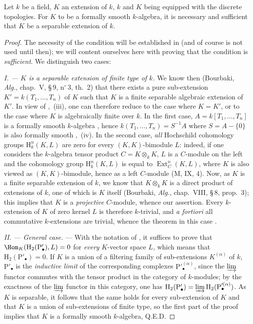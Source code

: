\begin{theorem}[19.6.1) (Cohen]
\label{0.19.6.1}
Let $k$ be a field, $K$ an extension of $k$, $k$ and $K$ being equipped with the discrete topologies.
For $K$ to be a formally smooth $k$-algebra, it is necessary and sufficient that $K$ be a separable extension of $k$.
\end{theorem}

\begin{proof}
The necessity of the condition will be established in  (and of course is not used until then);
we will content ourselves here with proving that the condition is \emph{sufficient}.
We distinguish two cases:

\emph{I. --- $K$ is a separable extension of finite type of $k$.}
We know then (Bourbaki, \emph{Alg.}, chap.~V, \S\,9, n$^\circ$\,3, th.~2) that there exists a pure sub-extension $K'=k(T_1,\ldots,T_n)$ of $K$ such that $K$ is a finite separable algebraic extension of $K'$.
  In view of ,~(iii), one can therefore reduce to the case where $K=K'$, or to the case where $K$ is algebraically finite over $k$.
In the first case, $A=k[T_1,\ldots,T_n]$ is a formally smooth $k$-algebra , hence $k(T_1,\ldots,T_n)=S^{-1}A$ where $S=A-\{0\}$ is also formally smooth ,~(iv).
In the second case, \emph{all} Hochschild cohomology groups $\mathrm{H}^n_k(K,L)$ are zero for every $(K,K)$-bimodule $L$:
indeed, if one considers the $k$-algebra tensor product $C=K\otimes_k K$, $L$ is a $C$-module on the left and the cohomology group $\mathrm{H}^n_k(K,L)$ is equal to $\operatorname{Ext}^n_C(K,L)$, where $K$ is also viewed as $(K,K)$-bimodule,
hence as a left $C$-module (M, IX, 4).
Now, as $K$ is a finite separable extension of $k$, we know that $K\otimes_k K$ is a direct product of extensions of $k$, one of which is $K$ itself (Bourbaki, \emph{Alg.}, chap.~VIII, \S\,8, prop.~3);
this implies that $K$ is a \emph{projective} $C$-module, whence our assertion.
Every $k$-extension of $K$ of zero kernel $L$ is therefore $k$-trivial, and \emph{a fortiori} all commutative $k$-extensions are trivial, whence the theorem in this case .

\emph{II. --- General case.} ---
With the notation of , it suffices to prove that $\Hom_K(\mathrm{H}_2(\mathrm{P}'_\bullet),L)=0$ for \emph{every} $K$-vector space $L$, which means that $\mathrm{H}_2(\mathrm{P}'_\bullet)=0$.
If $K$ is a union of a filtering family of sub-extensions $K^{(\alpha)}$ of $k$, $\mathrm{P}'_\bullet$ is the \emph{inductive limit} of the corresponding complexes $\mathrm{P}'^{(\alpha)}_\bullet$, since the $\varinjlim$ functor commutes with the tensor product in the category of $k$-modules;
by the exactness of the $\varinjlim$ functor in this category, one has $\mathrm{H}_2(\mathrm{P}'_\bullet)=\varinjlim\mathrm{H}_2(\mathrm{P}'^{(\alpha)}_\bullet)$.
As $K$ is separable, it follows that the same holds for every sub-extension of $K$ and that $K$ is a union of sub-extensions of finite type, so the first part of the proof implies that $K$ is a formally smooth $k$-algebra, Q.E.D.
\end{proof}

